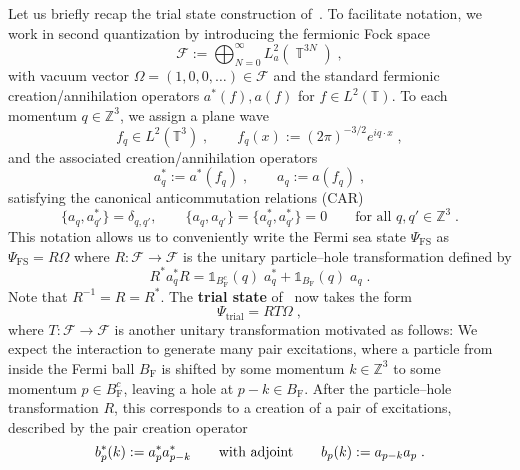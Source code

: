 \documentclass[12pt,a4paper]{article}
\numberwithin{equation}{section}
\newcommand{\cF}{\mathcal{F}}
\newcommand{\TTT}{\mathbb{T}}
\newcommand{\ZZZ}{\mathbb{Z}}
\newcommand{\1}{\mathbb{I}}
\newcommand{\F}{\mathrm{F}}
\newcommand{\FS}{\mathrm{FS}}
\newcommand{\trial}{\mathrm{trial}}
\DeclareMathOperator{\T}{\mathbb{T}}
\theoremstyle{plain}
\theoremstyle{definition}
\theoremstyle{remark}
\theoremstyle{plain}
\theoremstyle{definition}
\theoremstyle{remark}
\begin{document}
Let us briefly recap the trial state construction of~\cite{CHN???}. To facilitate notation, we work in second quantization by introducing the fermionic Fock space
\begin{equation}
	\cF := \bigoplus_{N=0}^\infty L^2_a(\T^{3N}) \;,
\end{equation}
with vacuum vector $ \Omega = (1,0,0,\ldots) \in \cF $ and the standard fermionic creation/annihilation operators $ a^*(f), a(f) $ for $ f \in L^2(\TTT) $. To each momentum $ q \in \ZZZ^3 $, we assign a plane wave
\begin{equation}
	f_q \in L^2(\TTT^3) \;, \qquad
	f_q(x) := (2 \pi)^{-3/2} e^{i q \cdot x} \;,
\end{equation}
and the associated creation/annihilation operators
\begin{equation}
	a^*_q := a^*(f_q) \;, \qquad
	a_q := a(f_q) \;,
\end{equation}
satisfying the canonical anticommutation relations (CAR)
\begin{equation} \label{eq:CAR}
	\{a_q, a_{q'}^*\} = \delta_{q, q'}, \qquad
	\{a_q, a_{q'}\} = \{a_q^*, a_{q'}^*\} = 0 \qquad \text{for all } q, q' \in \ZZZ^3\;.
\end{equation}
This notation allows us to conveniently write the Fermi sea state $ \Psi_{\FS} $ as $ \Psi_{\FS} = R \Omega $ where $ R: \cF \to \cF $ is the unitary particle--hole transformation defined by
\begin{equation} \label{eq:R}
	R^* a_q^* R
	= \mathds{1}_{B_{\F}^c}(q) \; a_q^*
		+ \mathds{1}_{B_{\F}}(q) \; a_q \;.
\end{equation}
Note that $ R^{-1} = R = R^* $. The \textbf{trial state} of~\cite{CHN23} now takes the form
\begin{equation} \label{eq:Psitrial}
	\Psi_{\trial} = R T \Omega \;,
\end{equation}
where $ T: \cF \to \cF $ is another unitary transformation motivated as follows: We expect the interaction to generate many pair excitations, where a particle from inside the Fermi ball $ B_{\F} $ is shifted by some momentum $ k \in \ZZZ^3 $ to some momentum $ p \in B_{\F}^c $, leaving a hole at $ p-k \in B_{\F} $. After the particle--hole transformation $ R $, this corresponds to a creation of a pair of excitations, described by the pair creation operator
\begin{equation} \label{eq:b}
	b^*_p(k) := a_p^* a_{p-k}^* 
	\qquad \textnormal{with adjoint} \qquad
	b_p(k) := a_{p-k} a_p \;.
\end{equation}
\end{document}
